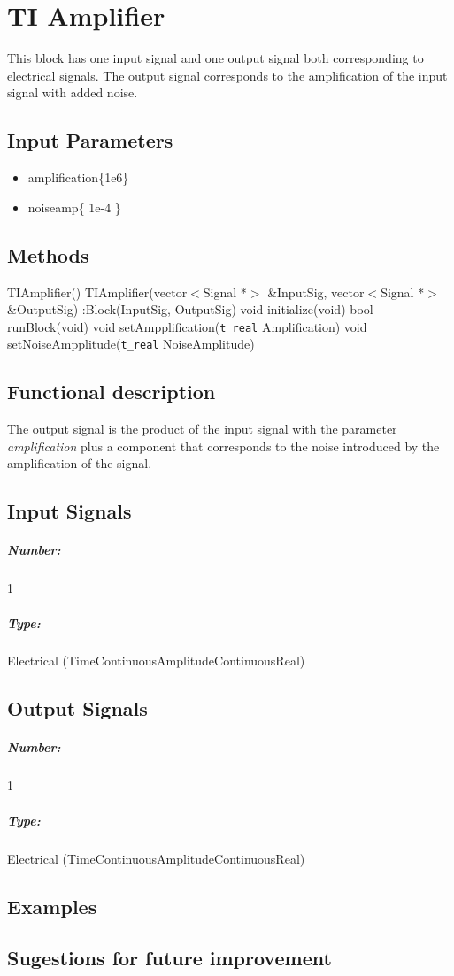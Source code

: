 \clearpage

\section{TI Amplifier}

\maketitle

This block has one input signal and one output signal both corresponding to electrical signals. The output signal corresponds to the amplification of the input signal with added noise.


\subsection*{Input Parameters}

\begin{itemize}
	\item amplification\{1e6\}
	\item noiseamp\{ 1e-4 \}
\end{itemize}

\subsection*{Methods}

TIAmplifier() {}
\bigbreak
TIAmplifier(vector$<$Signal *$>$ \&InputSig, vector$<$Signal *$>$ \&OutputSig) :Block(InputSig, OutputSig) {}
\bigbreak
void initialize(void)
\bigbreak
bool runBlock(void)
\bigbreak
void setAmpplification(\texttt{t\_real} Amplification)
\bigbreak
void setNoiseAmpplitude(\texttt{t\_real} NoiseAmplitude)

\subsection*{Functional description}

The output signal is the product of the input signal with the parameter \textit{amplification} plus a component that corresponds to the noise introduced by the amplification of the signal.

\pagebreak

\subsection*{Input Signals}

\subparagraph*{Number:} 1

\subparagraph*{Type:} Electrical (TimeContinuousAmplitudeContinuousReal)

\subsection*{Output Signals}

\subparagraph*{Number:} 1

\subparagraph*{Type:} Electrical (TimeContinuousAmplitudeContinuousReal)

\subsection*{Examples}



\subsection*{Sugestions for future improvement}

